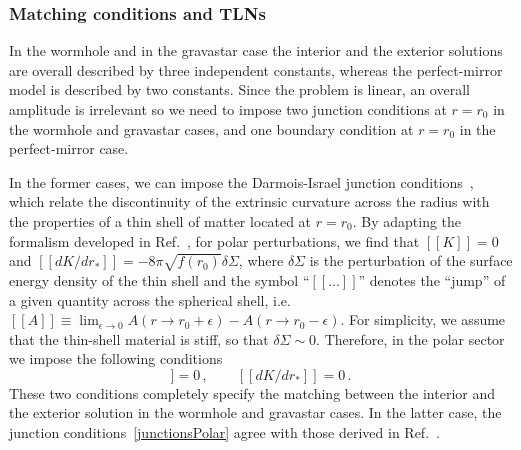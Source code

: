 \documentclass[aps,twocolumn,showpacs,preprintnumbers,nofootinbib,prd,superscriptaddress,groupedaddress,10pt]{revtex4-1}
\begin{document}


\subsubsection{Matching conditions and TLNs}\label{matching}
In the wormhole and in the gravastar case the interior and the exterior solutions are overall described by three independent constants, whereas the perfect-mirror model is described by two constants. Since the problem is linear, an overall amplitude is irrelevant so we need to impose two junction conditions at $r=r_0$ in the wormhole and gravastar cases, and one boundary condition at $r=r_0$ in the perfect-mirror case.

In the former cases, we can impose the Darmois-Israel junction conditions~\cite{Israel:1966rt}, which relate the discontinuity of the extrinsic curvature across the radius with the properties of a thin shell of matter located at $r=r_0$. By adapting the formalism developed in Ref.~\cite{Pani:2009ss}, for polar perturbations, we find that $[[K]]=0$ and $[[dK/dr_*]]=-8\pi \sqrt{f(r_0)}\delta\Sigma$, where $\delta\Sigma$ is the perturbation of the surface energy density of the thin shell and the symbol ``$[[\ldots]]$'' denotes the ``jump'' of a given quantity across
the spherical shell, i.e. $[[A]] \equiv \lim_{\epsilon\to0}{A(r\to r_0 +\epsilon)-A(r\to r_0-\epsilon)}$. For simplicity, we assume that the thin-shell material is stiff, so that $\delta\Sigma\sim 0$. Therefore, in the polar sector we impose the following conditions
\begin{equation}
 [[K]]=0 \,, \qquad [[dK/dr_*]]=0\,. \label{junctionsPolar}
\end{equation}
These two conditions completely specify the matching between the interior and the exterior solution in the wormhole and gravastar cases. In the latter case, the junction conditions~\eqref{junctionsPolar} agree with those derived in Ref.~\cite{Uchikata:2016qku}.
\end{document}
